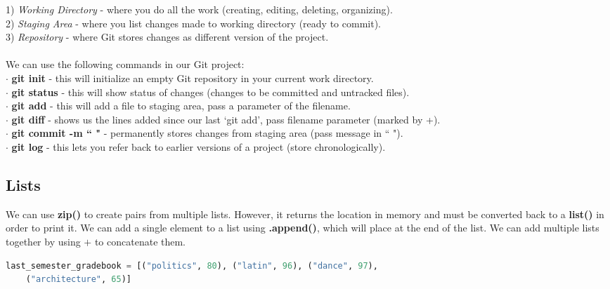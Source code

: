 \documentclass[11pt, a4paper]{article}
\begin{document}
\begin{spacing}{1.1}
	\hspace*{1.5mm} 1) \textit{Working Directory} - where you do all the work (creating, editing, deleting, organizing). \\
	\hspace*{1.5mm} 2) \textit{Staging Area} - where you list changes made to working directory (ready to commit). \\
	\hspace*{1.5mm} 3) \textit{Repository} - where Git stores changes as different version of the project. \\~\\
	We can use the following commands in our Git project: \\
	\hspace*{1.5mm} $\cdot$ \textbf{git init} - this will initialize an empty Git repository in your current work directory. \\
	\hspace*{1.5mm} $\cdot$ \textbf{git status} - this will show status of changes (changes to be committed and untracked files). \\
	\hspace*{1.5mm} $\cdot$ \textbf{git add} - this will add a file to staging area, pass a parameter of the filename. \\
	\hspace*{1.5mm} $\cdot$ \textbf{git diff} - shows us the lines added since our last `git add', pass filename parameter (marked by \textcolor{codegreen}{+}). \\
	\hspace*{1.5mm} $\cdot$ \textbf{git commit -m `` "} - permanently stores changes from staging area (pass message in `` "). \\
	\hspace*{1.5mm} $\cdot$ \textbf{git log} - this lets you refer back to earlier versions of a project (store chronologically). \\
	\subsection{Lists}
	We can use \textbf{zip()} to create pairs from multiple lists. However, it returns the location in memory and must be converted back to a \textbf{list()} in order to print it. We can add a single element to a list using \textbf{.append()}, which will place at the end of the list. We can add multiple lists together by using $\bm{+}$ to concatenate them.
	\begin{lstlisting}[language=Python]
	last_semester_gradebook = [("politics", 80), ("latin", 96), ("dance", 97), 
	("architecture", 65)]
	

\end{lstlisting}
\end{spacing}
\end{document}
